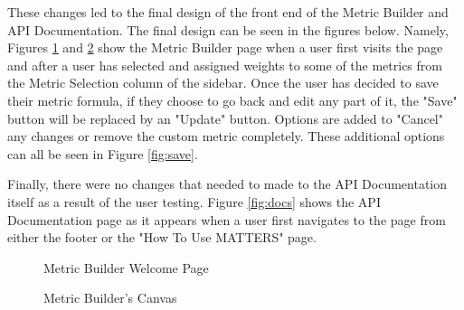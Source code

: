 		These changes led to the final design of the front end of the Metric Builder 
		and API Documentation. The final design can be seen in the figures below. Namely, Figures \ref{fig:mb} and \ref{fig:inuse} show the Metric Builder page when a user first visits 
		the page and after a user has selected and assigned weights to some of the metrics from the Metric Selection column of the sidebar. Once the user has decided to save their metric formula, 
		if they choose to go back and edit any part of it, the "Save" button will be replaced by an "Update" button. Options are added to "Cancel" any changes or remove the custom metric completely. 
		These additional options can all be seen in Figure \ref{fig:save}. 
		
		Finally, there were no changes that needed to made to the API Documentation itself as a result of the user testing. 
		Figure \ref{fig:docs} shows the API Documentation page as it appears when a user first navigates to the page from either the footer or the "How To Use MATTERS" page.

			\begin{figure}[t]
				\centering
					\caption{Metric Builder Welcome Page}
					\label{fig:mb}
			\end{figure}
			
			\begin{figure}[t]
				\centering
					\caption{Metric Builder's Canvas}
					\label{fig:inuse}
			\end{figure}
			
